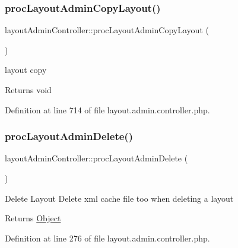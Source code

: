 \hypertarget{classlayoutAdminController_afaf005eb86d8c09e2c610f743dbb1522}{}\label{classlayoutAdminController_afaf005eb86d8c09e2c610f743dbb1522} 
\subsubsection{\texorpdfstring{proc\+Layout\+Admin\+Copy\+Layout()}{procLayoutAdminCopyLayout()}}
{\footnotesize\ttfamily layout\+Admin\+Controller\+::proc\+Layout\+Admin\+Copy\+Layout (\begin{DoxyParamCaption}{ }\end{DoxyParamCaption})}

layout copy \begin{DoxyReturn}{Returns}
void 
\end{DoxyReturn}


Definition at line 714 of file layout.\+admin.\+controller.\+php.

\hypertarget{classlayoutAdminController_a4a394a3902b03d0e7454f3b5047c1d5e}{}\label{classlayoutAdminController_a4a394a3902b03d0e7454f3b5047c1d5e} 
\subsubsection{\texorpdfstring{proc\+Layout\+Admin\+Delete()}{procLayoutAdminDelete()}}
{\footnotesize\ttfamily layout\+Admin\+Controller\+::proc\+Layout\+Admin\+Delete (\begin{DoxyParamCaption}{ }\end{DoxyParamCaption})}

Delete Layout Delete xml cache file too when deleting a layout \begin{DoxyReturn}{Returns}
\hyperlink{classObject}{Object} 
\end{DoxyReturn}


Definition at line 276 of file layout.\+admin.\+controller.\+php.

\hypertarget{classlayoutAdminController_aa80e244c2f02d0c46c6bee2f5921f4aa}{}\label{classlayoutAdminController_aa80e244c2f02d0c46c6bee2f5921f4aa} 
